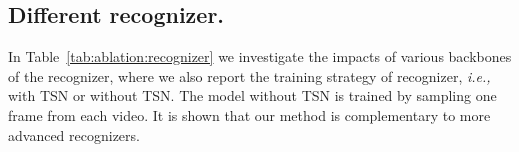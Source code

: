 \documentclass[runningheads]{llncs}
\newcommand{\tabref}[1]{Table~\ref{#1}}
\begin{document}
\subsection{Different recognizer.}
In \tabref{tab:ablation:recognizer} we investigate the impacts of various backbones of the recognizer, where we also report the training strategy of recognizer, \emph{i.e.,} with TSN or without TSN. The model without TSN is trained by sampling one frame from each video. 
It is shown that our method is complementary to more advanced recognizers.
\begin{table}[h]
\centering
{}
\caption{Study on different backbones for the recognizer. ``Train'' refers to training strategy, \emph{viz.,} with TSN style training or without TSN style Training.}
\label{tab:ablation:recognizer}
\end{table}
\end{document}
